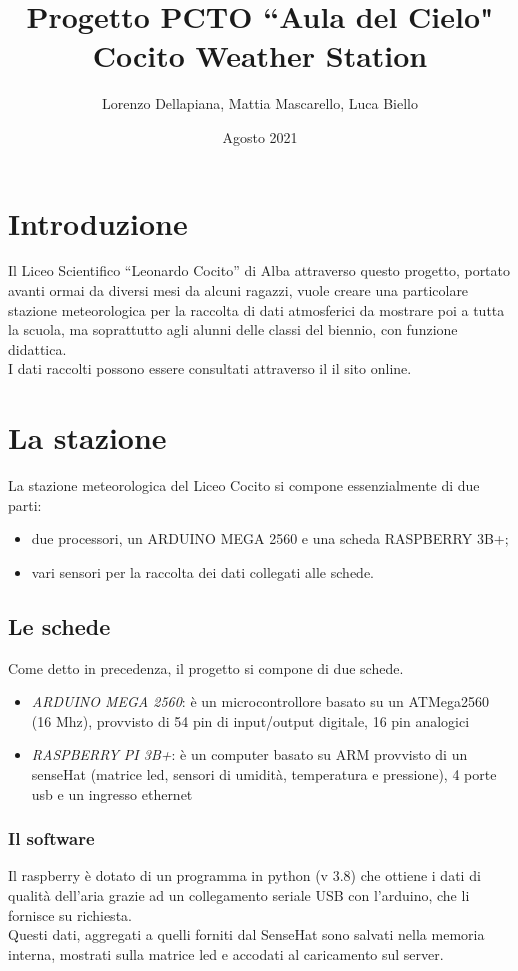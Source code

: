 \documentclass{article}
\title{%
  Progetto PCTO ``Aula del Cielo" \\
  \large Cocito Weather Station}
\author{Lorenzo Dellapiana, Mattia Mascarello, Luca Biello}
\date{Agosto 2021}
\def\blankpage{%
      \clearpage%
      \thispagestyle{empty}%
      \addtocounter{page}{-1}%
      \null%
      \clearpage}
\begin{document}
\maketitle
\pagebreak
\vspace*{\fill}
\tableofcontents
\vspace*{\fill}
\blankpage
\pagebreak
\section{Introduzione}
Il Liceo Scientifico “Leonardo Cocito” di Alba attraverso questo progetto, portato avanti ormai da diversi mesi da alcuni ragazzi, vuole creare una particolare stazione meteorologica per la raccolta di dati atmosferici da mostrare poi a tutta la scuola, ma soprattutto agli alunni delle classi del biennio, con funzione didattica.\\
I dati raccolti possono essere consultati attraverso il il sito online.
\section{La stazione}
La stazione meteorologica del Liceo Cocito si compone essenzialmente di due parti:
\begin{itemize}
\item due processori, un ARDUINO MEGA 2560 e una scheda RASPBERRY 3B+;\\
\item vari sensori per la raccolta dei dati collegati alle schede.
\end{itemize}
\subsection{Le schede}
Come detto in precedenza, il progetto si compone di due schede.
\begin{itemize}
\item \emph{ARDUINO MEGA 2560}: è un microcontrollore basato su un ATMega2560 (16 Mhz), provvisto di 54 pin di input/output digitale, 16 pin analogici\\ 
\item \emph{RASPBERRY PI 3B+}: è un computer basato su ARM provvisto di un senseHat (matrice led, sensori di umidità, temperatura e pressione), 4 porte usb e un ingresso ethernet
\end{itemize}
\subsubsection{Il software}
Il raspberry è dotato di un programma in python (v 3.8) che ottiene i dati di qualità dell'aria grazie ad un collegamento seriale USB con l'arduino, che li fornisce su richiesta.\\
Questi dati, aggregati a quelli forniti dal SenseHat sono salvati nella memoria interna, mostrati sulla matrice led e accodati al caricamento sul server.
\end{document}
